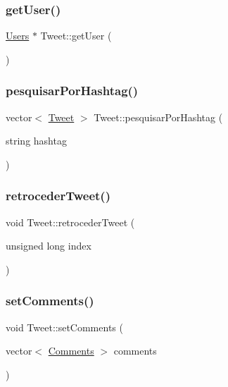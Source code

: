 \mbox{\label{class_tweet_a4f0bf8c0ac90793ba16049390052f18a}} 
\subsubsection{\texorpdfstring{get\+User()}{getUser()}}
{\footnotesize\ttfamily \hyperlink{class_users}{Users} $\ast$ Tweet\+::get\+User (\begin{DoxyParamCaption}{ }\end{DoxyParamCaption})}

\mbox{\label{class_tweet_a078594cc97b6ecdd8da0eb4db315bd75}} 
\subsubsection{\texorpdfstring{pesquisar\+Por\+Hashtag()}{pesquisarPorHashtag()}}
{\footnotesize\ttfamily vector$<$ \hyperlink{class_tweet}{Tweet} $>$ Tweet\+::pesquisar\+Por\+Hashtag (\begin{DoxyParamCaption}\item[{string}]{hashtag }\end{DoxyParamCaption})}

\mbox{\label{class_tweet_ad596dc45a95674b8197fed0636472053}} 
\subsubsection{\texorpdfstring{retroceder\+Tweet()}{retrocederTweet()}}
{\footnotesize\ttfamily void Tweet\+::retroceder\+Tweet (\begin{DoxyParamCaption}\item[{unsigned long}]{index }\end{DoxyParamCaption})}

\mbox{\label{class_tweet_a3f110956ae50164f10f88bed321a4e59}} 
\subsubsection{\texorpdfstring{set\+Comments()}{setComments()}}
{\footnotesize\ttfamily void Tweet\+::set\+Comments (\begin{DoxyParamCaption}\item[{vector$<$ \hyperlink{class_comments}{Comments} $>$}]{comments }\end{DoxyParamCaption})}

